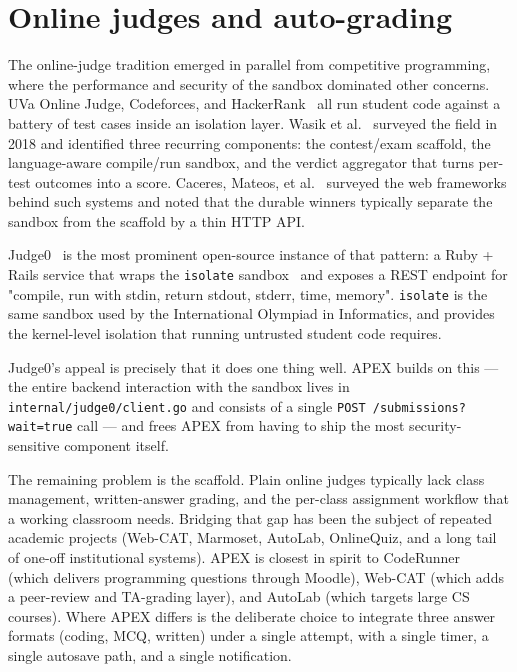 \section{Online judges and auto-grading}

The online-judge tradition emerged in parallel from competitive programming, where the performance and security of the sandbox dominated other concerns. UVa Online Judge, Codeforces, and HackerRank~\cite{hackerrank} all run student code against a battery of test cases inside an isolation layer. Wasik et al.~\cite{wasik2018survey} surveyed the field in 2018 and identified three recurring components: the contest/exam scaffold, the language-aware compile/run sandbox, and the verdict aggregator that turns per-test outcomes into a score. Caceres, Mateos, et al.~\cite{caceres2014online} surveyed the web frameworks behind such systems and noted that the durable winners typically separate the sandbox from the scaffold by a thin HTTP API.

Judge0~\cite{judge0,dosilovic2018judge0} is the most prominent open-source instance of that pattern: a Ruby + Rails service that wraps the \texttt{isolate} sandbox~\cite{isolate} and exposes a REST endpoint for "compile, run with stdin, return stdout, stderr, time, memory". \texttt{isolate} is the same sandbox used by the International Olympiad in Informatics, and provides the kernel-level isolation that running untrusted student code requires.

Judge0's appeal is precisely that it does one thing well. APEX builds on this --- the entire backend interaction with the sandbox lives in \texttt{internal/judge0/client.go} and consists of a single \texttt{POST /submissions?wait=true} call --- and frees APEX from having to ship the most security-sensitive component itself.

The remaining problem is the scaffold. Plain online judges typically lack class management, written-answer grading, and the per-class assignment workflow that a working classroom needs. Bridging that gap has been the subject of repeated academic projects (Web-CAT, Marmoset, AutoLab, OnlineQuiz, and a long tail of one-off institutional systems). APEX is closest in spirit to CodeRunner~\cite{coderunner} (which delivers programming questions through Moodle), Web-CAT (which adds a peer-review and TA-grading layer), and AutoLab (which targets large CS courses). Where APEX differs is the deliberate choice to integrate three answer formats (coding, MCQ, written) under a single attempt, with a single timer, a single autosave path, and a single notification.

